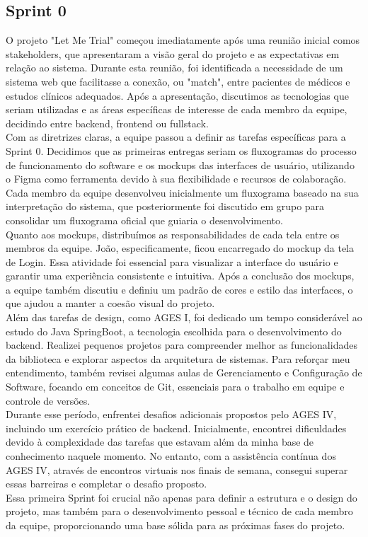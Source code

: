 \subsection{Sprint 0}

O projeto "Let Me Trial" começou imediatamente após uma reunião inicial comos stakeholders, que apresentaram a visão geral do projeto e as expectativas em relação ao sistema. Durante esta reunião, foi identificada a necessidade de um sistema web que facilitasse a conexão, ou "match", entre pacientes de médicos e estudos clínicos adequados. Após a apresentação, discutimos as tecnologias que seriam utilizadas e as áreas específicas de interesse de cada membro da equipe, decidindo entre backend, frontend ou fullstack.\\


Com as diretrizes claras, a equipe passou a definir as tarefas específicas para
a Sprint 0. Decidimos que as primeiras entregas seriam os fluxogramas do processo de funcionamento do software e os mockups das interfaces de usuário, utilizando o Figma como ferramenta devido à sua flexibilidade e recursos de colaboração. Cada membro da equipe desenvolveu inicialmente um fluxograma baseado na sua interpretação do sistema, que posteriormente foi discutido em grupo para consolidar um fluxograma oficial que guiaria o desenvolvimento.\\

Quanto aos mockups, distribuímos as responsabilidades de cada tela entre os membros da equipe. João, especificamente, ficou encarregado do mockup da tela de Login. Essa atividade foi essencial para visualizar a interface do usuário e garantir uma experiência consistente e intuitiva. Após a conclusão dos mockups, a equipe também discutiu e definiu um padrão de cores e estilo das interfaces, o que ajudou a manter a coesão visual do projeto.\\

Além das tarefas de design, como AGES I, foi dedicado um tempo considerável ao estudo do Java SpringBoot, a tecnologia escolhida para o desenvolvimento do backend. Realizei pequenos projetos para compreender melhor as funcionalidades da biblioteca e explorar aspectos da arquitetura de sistemas. Para reforçar meu entendimento, também revisei algumas aulas de Gerenciamento e Configuração de Software, focando em conceitos de Git, essenciais para o trabalho em equipe e controle de versões.\\

Durante esse período, enfrentei desafios adicionais propostos pelo AGES IV, incluindo um exercício prático de backend. Inicialmente, encontrei dificuldades devido à complexidade das tarefas que estavam além da minha base de conhecimento naquele momento. No entanto, com a assistência contínua dos AGES IV, através de encontros virtuais nos finais de semana, consegui superar essas barreiras e completar o desafio proposto.\\

Essa primeira Sprint foi crucial não apenas para definir a estrutura e o design do projeto, mas também para o desenvolvimento pessoal e técnico de cada membro da equipe, proporcionando uma base sólida para as próximas fases do projeto.

